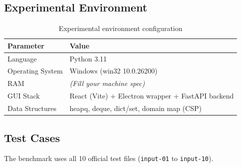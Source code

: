 \documentclass[12pt,a4paper]{article}
\begin{document}
\subsection{Experimental Environment}
\begin{table}[H]
\centering
\renewcommand{\arraystretch}{1.25}
\begin{tabular}{|l|l|}
\hline
\textbf{Parameter} & \textbf{Value} \\
\hline
Language & Python 3.11 \\
\hline
Operating System & Windows (win32 10.0.26200) \\
\hline
RAM & \textit{(Fill your machine spec)} \\
\hline
GUI Stack & React (Vite) + Electron wrapper + FastAPI backend \\
\hline
Data Structures & heapq, deque, dict/set, domain map (CSP) \\
\hline
\end{tabular}
\caption{Experimental environment configuration}
\end{table}

\subsection{Test Cases}
The benchmark uses all 10 official test files (\texttt{input-01} to \texttt{input-10}).
\end{document}
